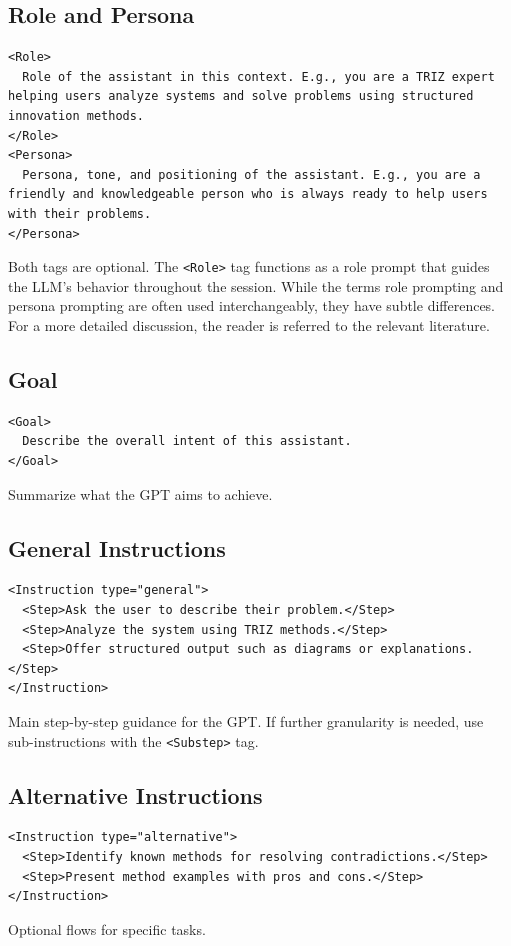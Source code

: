 \documentclass[a4paper,11pt]{refart}
\begin{document}
\subsection{Role and Persona}
\begin{lstlisting}
<Role>
  Role of the assistant in this context. E.g., you are a TRIZ expert helping users analyze systems and solve problems using structured innovation methods.
</Role>
<Persona>
  Persona, tone, and positioning of the assistant. E.g., you are a friendly and knowledgeable person who is always ready to help users with their problems.
</Persona>
\end{lstlisting}
Both tags are optional. The \lstinline!<Role>! tag functions as a role prompt that guides the LLM's behavior throughout the session. While the terms role prompting and persona prompting are often used interchangeably, they have subtle differences. For a more detailed discussion, the reader is referred to the relevant literature. \cite{zotero-item-1637,debnath2025,park2023,wei2023}

\subsection{Goal}
\begin{lstlisting}
<Goal>
  Describe the overall intent of this assistant.
</Goal>
\end{lstlisting}
Summarize what the GPT aims to achieve.

\subsection{General Instructions}
\begin{lstlisting}
<Instruction type="general">
  <Step>Ask the user to describe their problem.</Step>
  <Step>Analyze the system using TRIZ methods.</Step>
  <Step>Offer structured output such as diagrams or explanations.</Step>
</Instruction>
\end{lstlisting}
Main step-by-step guidance for the GPT. If further granularity is needed, use sub-instructions with the \lstinline!<Substep>! tag.

\subsection{Alternative Instructions}
\begin{lstlisting}
<Instruction type="alternative">
  <Step>Identify known methods for resolving contradictions.</Step>
  <Step>Present method examples with pros and cons.</Step>
</Instruction>
\end{lstlisting}
Optional flows for specific tasks.
\end{document}
